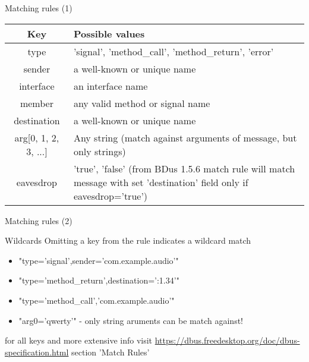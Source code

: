 \documentclass{beamer}
\begin{document}
\begin{frame}{Matching rules (1)}
  \begin{small}
    \begin{center}
      \begin{tabulary}{1.0\textwidth}{|C|L|}
\hline
Key & Possible values\\
\hline
\hline
type & 'signal', 'method\_call', 'method\_return', 'error'\\
\hline
sender & a well-known or unique name\\
\hline
interface & an interface name\\
\hline
member & 	any valid method or signal name\\
\hline
destination & a well-known or unique name\\
\hline
arg[0, 1, 2, 3, ...] & Any string (match against arguments of message, but only strings)\\
\hline
eavesdrop & 'true', 'false' (from BDus 1.5.6 match rule will match message with set 'destination' field only if eavesdrop='true')\\
\hline
      \end{tabulary}
    \end{center}
  \end{small} 
\end{frame}

\begin{frame}{Matching rules (2)}
  \begin{block}{Wildcards}
    Omitting a key from the rule indicates a wildcard match
  \end{block}
  \vfill
  \pause
  \begin{itemize}
    \item "type='signal',sender='com.example.audio'"
    \item "type='method\_return',destination=':1.34'"
    \item "type='method\_call','com.example.audio'"
    \item "arg0='qwerty'" - only string aruments can be match against!
  \end{itemize}
  \vfill
  \begin{small}
    \begin{exampleblock}{for all keys and more extensive info visit}  
       \url{https://dbus.freedesktop.org/doc/dbus-specification.html} section 'Match Rules'\\
    \end{exampleblock}
  \end{small}
\end{frame}
\end{document}
